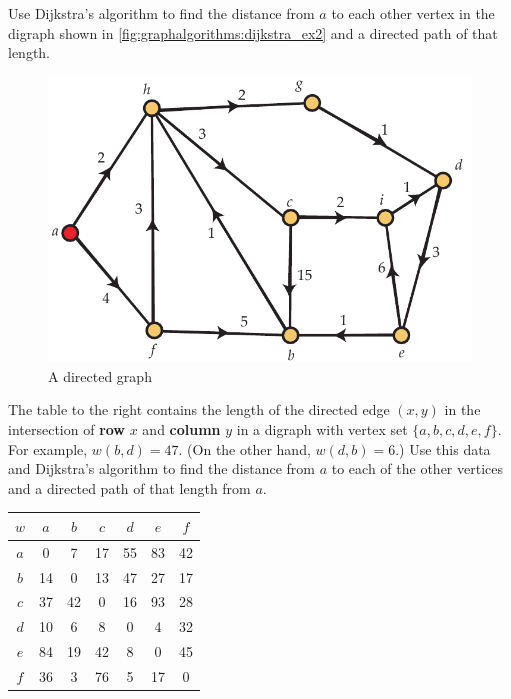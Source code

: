 \begin{enumerate}
\item Use Dijkstra's algorithm to find the distance from $a$ to each
  other vertex in the digraph shown in
  \autoref{fig:graphalgorithms:dijkstra_ex2} and a directed path of
  that length.
  \begin{figure}[h]
    \centering
    \includegraphics[scale=0.65]{graphalgorithms-figs/dijkstra_ex2}
    \caption{A directed graph}
    \label{fig:graphalgorithms:dijkstra_ex2}
  \end{figure}

\begin{minipage}{0.5\textwidth}
\item The table to the right contains the length of the directed edge
  $(x,y)$ in the intersection of \textbf{row} $x$ and \textbf{column}
  $y$ in a digraph with vertex set $\{a,b,c,d,e,f\}$. For example,
  $w(b,d)=47$. (On the other hand, $w(d,b)=6$.) Use this data and
  Dijkstra's algorithm to find the distance from $a$ to each of the
  other vertices and a directed path of that length from $a$.
\end{minipage}\hspace{0.02\textwidth}\begin{minipage}{0.45\textwidth}
    \begin{tabular}{|c|c|c|c|c|c|c|}
      \hline
      $w$ & $a$ & $b$ & $c$ & $d$ & $e$ & $f$\\
      \hline
      $a$ & 0 & 7 & 17 & 55 & 83 & 42\\
      \hline
      $b$ & 14 & 0 & 13 & 47 & 27 & 17\\
      \hline
      $c$ & 37 & 42 & 0 & 16 & 93 & 28\\
      \hline
      $d$ & 10 & 6 & 8 & 0 & 4 & 32\\
      \hline
      $e$ & 84 & 19 & 42 & 8 & 0 & 45\\
      \hline
      $f$ & 36 & 3 & 76 & 5 & 17 & 0\\
      \hline
    \end{tabular}
\end{minipage}


\end{enumerate}
